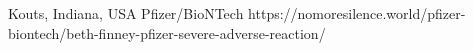           {Kouts, Indiana, USA}
          {}
          {Pfizer/BioNTech}
          {}
          {}
          {https://nomoresilence.world/pfizer-biontech/beth-finney-pfizer-severe-adverse-reaction/}
